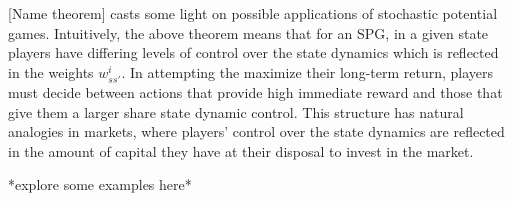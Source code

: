 [Name theorem] casts some light on possible applications of stochastic potential games. Intuitively, the above theorem means that for an SPG, in a given state players have differing levels of control over the state dynamics which is reflected in the weights $w^i_{ss'}$. In attempting the maximize their long-term return, players must decide between actions that provide high immediate reward and those that give them a larger share state dynamic control. This structure has natural analogies in markets, where players' control over the state dynamics are reflected in the amount of capital they have at their disposal to invest in the market. 

*explore some examples here*












